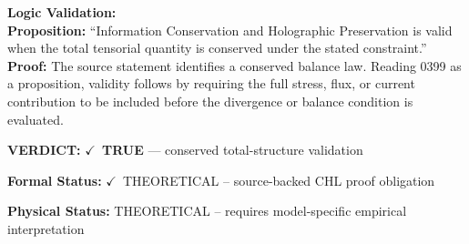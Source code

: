 \textbf{Logic Validation:}\\
\textbf{Proposition:} ``Information Conservation and Holographic Preservation is valid when the total tensorial
quantity is conserved under the stated constraint.''\\
\textbf{Proof:} The source statement identifies a conserved balance law. Reading 0399 as a proposition,
validity follows by requiring the full stress, flux, or current contribution to be
included before the divergence or balance condition is evaluated.

\textbf{VERDICT:} \ensuremath{\checkmark}\ \textbf{TRUE} --- conserved total-structure validation

\textbf{Formal Status:} \ensuremath{\checkmark}\ THEORETICAL -- source-backed CHL proof obligation

\textbf{Physical Status:} THEORETICAL -- requires model-specific empirical interpretation
\par\vspace{0.45em}
\par
\ifTZPDarkEdition
{}
\fi
\endgroup
\endgroup
